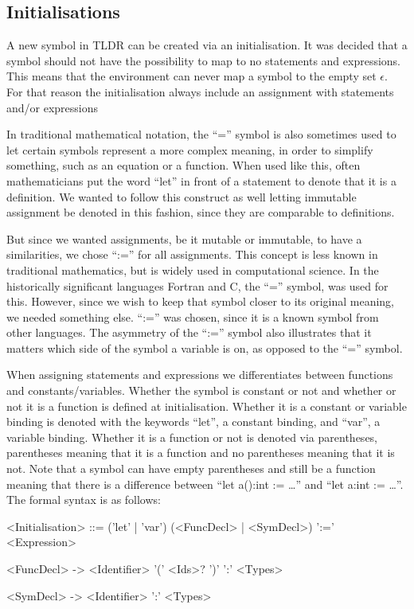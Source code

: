 \subsection{Initialisations}\label{subsec:initialisations}
A new symbol in TLDR can be created via an initialisation. It was decided that a symbol should not have the possibility to map to no statements and expressions. This means that the environment can never map a symbol to the empty set $\epsilon$. For that reason the initialisation always include an assignment with statements and/or expressions

In traditional mathematical notation, the \enquote{=} symbol is also sometimes used to let certain symbols represent a more complex meaning, in order to simplify something, such as an equation or a function. When used like this, often mathematicians put the word \enquote{let} in front of a statement to denote that it is a definition. We wanted to follow this construct as well letting immutable assignment be denoted in this fashion, since they are comparable to definitions. 

But since we wanted assignments, be it mutable or immutable, to have a similarities, we chose \enquote{:=} for all assignments. This concept is less known in traditional mathematics, but is widely used in computational science. In the historically significant languages Fortran and C, the \enquote{=} symbol, was used for this. However, since we wish to keep that symbol closer to its original meaning, we needed something else. \enquote{:=} was chosen, since it is a known symbol from other languages. The asymmetry of the \enquote{:=} symbol also illustrates that it matters which side of the symbol a variable is on, as opposed to the \enquote{=} symbol.

When assigning statements and expressions we differentiates between functions and constants/variables. Whether the symbol is constant or not and whether or not it is a function is defined at initialisation. Whether it is a constant or variable binding is denoted with the keywords \enquote{let}, a constant binding, and \enquote{var}, a variable binding. Whether it is a function or not is denoted via parentheses, parentheses meaning that it is a function and no parentheses meaning that it is not. Note that a symbol can have empty parentheses and still be a function meaning that there is a difference between \enquote{let a():int := \dots} and \enquote{let a:int := \dots}. The formal syntax is as follows: 

\begin{grammar}
<Initialisation> ::= ('let' | 'var') (<FuncDecl> | <SymDecl>) ':=' <Expression>

<FuncDecl> -> <Identifier> '(' <Ids>? ')' ':' <Types>

<SymDecl> -> <Identifier> ':' <Types>
\end{grammar}

